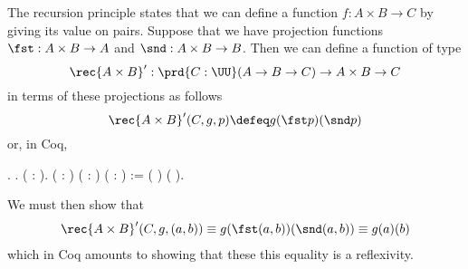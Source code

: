  \soln 
The recursion principle states that we can define a function $f : A \times B
\to C$ by giving its value on pairs.  Suppose that we have projection functions
$\fst : A \times B \to A$ and $\snd : A \times B \to B$.  Then we can define a
function of type
\[
  \rec{A\times B}' : \prd{C : \UU} (A \to B \to C) \to A \times B \to C
\]
in terms of these projections as follows
\[
  \rec{A \times B}'(C, g, p) \defeq g(\fst p)(\snd p)
\]
or, in Coq,
\begin{coqdoccode}
\coqdocemptyline
\coqdocnoindent
{} .\coqdoceol
\coqdocemptyline
\coqdocnoindent
{} .\coqdoceol
\coqdocnoindent
{} (  : ).\coqdoceol
\coqdocemptyline
\coqdocnoindent
{}  ( : ) ( :     ) ( :   ) \coqdoceol
\coqdocindent{1.00em}
:=  ( ) ( ).\coqdoceol
\coqdocemptyline
\end{coqdoccode}
We must then show that
\begin{align*}
    \rec{A\times B}'(C, g, (a, b)) 
    \equiv g(\fst (a, b))(\snd (a, b))
    \equiv g(a)(b)
\end{align*}
which in Coq amounts to showing that these this equality is a reflexivity.
